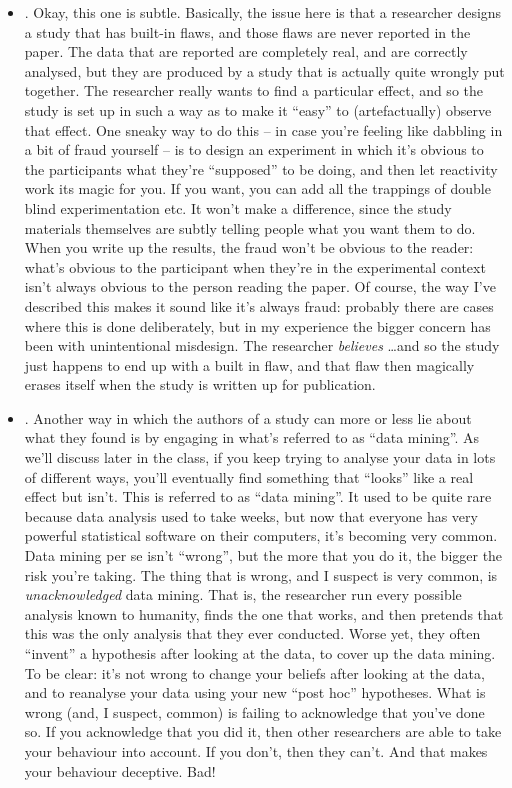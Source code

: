 \begin{itemize}
\item {}. Okay, this one is subtle. Basically, the issue here is that a researcher designs a study that has built-in flaws, and those flaws are never reported in the paper. The data that are reported are completely real, and are correctly analysed, but they are produced by a study that is actually quite wrongly put together. The researcher really wants to find a particular effect, and so the study is set up in such a way as to make it ``easy'' to (artefactually) observe that effect. One sneaky way to do this -- in case you're feeling like dabbling in a bit of fraud yourself -- is to design an experiment in which it's  obvious to the participants what they're ``supposed'' to be doing, and then let reactivity work its magic for you. If you want, you can add all the trappings of double blind experimentation etc. It won't make a difference, since the study materials themselves are subtly telling people what you want them to do. When you write up the results, the fraud won't be obvious to the reader: what's obvious to the participant when they're in the experimental context isn't always obvious to the person reading the paper. Of course, the way I've described this makes it sound like it's always fraud: probably there are cases where this is done deliberately, but in my experience the bigger concern has been with unintentional misdesign. The researcher {\it believes} \ldots and so the study just happens to end up with a built in flaw, and that flaw then magically erases itself when the study is written up for publication.
\item {}. Another way in which the authors of a study can more or less lie about what they found is by engaging in what's referred to as ``data mining''. As we'll discuss later in the class, if you keep trying to analyse your data in lots of different ways, you'll eventually find something that ``looks'' like a real effect but isn't. This is referred to as ``data mining''. It used to be quite rare because data analysis used to take weeks, but now that everyone has very powerful statistical software on their computers, it's becoming very common. Data mining per se isn't ``wrong'', but the more that you do it, the bigger the risk you're taking. The thing that is wrong, and I suspect is very common, is {\it unacknowledged} data mining. That is, the researcher run every possible analysis known to humanity, finds the one that works, and then pretends that this was the only analysis that they ever conducted. Worse yet, they often ``invent'' a hypothesis after looking at the data, to cover up the data mining. To be clear: it's not wrong to change your beliefs after looking at the data, and to reanalyse your data using your new ``post hoc'' hypotheses. What is wrong (and, I suspect, common) is failing to acknowledge that you've done so. If you acknowledge that you did it, then other researchers are able to take your behaviour into account. If you don't, then they can't. And that makes your behaviour deceptive. Bad! 

\end{itemize}

